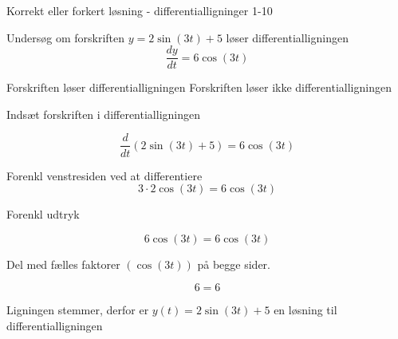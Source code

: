 \documentclass{article}
\begin{document}
\begin{exercise}{Korrekt eller forkert løsning - differentialligninger 1-10}
	
	
	Undersøg om forskriften $y = 2 \sin(3t) + 5$ løser differentialligningen
	\[
	\frac{dy}{dt} = 6 \cos(3t)
	\]
	
\begin{multichoice}
	\itemtrue Forskriften løser differentialligningen 
	\itemfalse Forskriften løser ikke differentialligningen 
\end{multichoice}
	
	\hint
	
	Indsæt forskriften i differentialligningen
	
	\hint
	\[
	\frac{d}{dt} \left( 2 \sin(3t) + 5\right) = 6 \cos(3t)
	\]
	
	
	\hint
	
	Forenkl venstresiden ved at differentiere
	\[
	3	\cdot 2 \cos(3t) = 6 \cos(3t)
	\]
	
	\hint
	
	Forenkl udtryk
		
	\hint
	\[
	6 \cos(3t) = 6 \cos(3t)
	\]
	
	\hint
	Del med fælles faktorer $\left(\cos(3t)\right)$ på begge sider.
	
	\hint
	
	\[
	6 = 6
	\]
	
	
	\hint
	
	Ligningen stemmer, derfor er $y(t) = 2 \sin(3t) + 5$  en løsning til differentialligningen
	
\end{exercise}

\newpage
\end{document}

